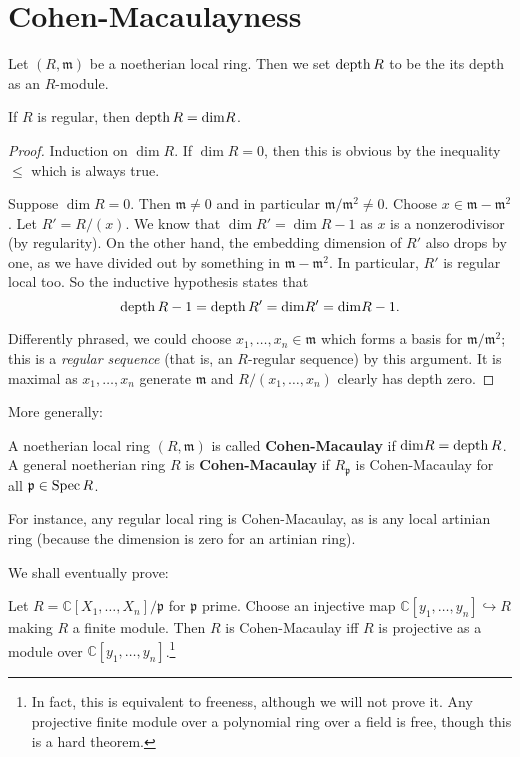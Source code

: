 \section{Cohen-Macaulayness}

\begin{definition}
Let $(R, \mathfrak{m})$ be a noetherian local ring. Then
we set $\operatorname{depth} R$ to be the its depth as an $R$-module.
\end{definition}




\begin{example}
If $R$ is regular, then $\operatorname{depth} R = \mathrm{dim} R$.
\end{example}
\begin{proof}
Induction on $\dim R$. If $\dim R=0$, then this is obvious by
the inequality
$\leq $ which is always true.

Suppose $\dim R = 0$. Then $\mathfrak{m} \neq 0$ and in
particular
$\mathfrak{m}/\mathfrak{m}^2 \neq 0$. Choose $x \in
\mathfrak{m}-
\mathfrak{m}^2$. Let $R'=R/(x)$. We know that $\dim R' = \dim
R-1$ as $x$ is a
nonzerodivisor (by regularity). On the other hand, the embedding
dimension of $R'$ also drops
by one, as we have divided out by something in $\mathfrak{m} -
\mathfrak{m}^2$.
In particular, $R'$ is regular local too. So the inductive
hypothesis states
that
\[\operatorname{depth} R-1 =  \operatorname{depth} R' = \mathrm{dim} R' = \mathrm{dim} R -1.   \]

Differently phrased, we could choose $x_1, \dots, x_n \in
\mathfrak{m}$ which forms a basis for
$\mathfrak{m}/\mathfrak{m}^2$; this is a
\emph{regular sequence} (that is, an $R$-regular sequence) by
this argument. It
is maximal as $x_1, \dots, x_n$ generate $\mathfrak{m}$ and
$R/(x_1, \dots,
x_n)$ clearly has depth zero.
\end{proof}

More generally:
\begin{definition}
A noetherian local ring $(R, \mathfrak{m})$ is called
\textbf{Cohen-Macaulay}
if $\mathrm{dim} R = \operatorname{depth} R$. A general noetherian ring $R$ is
\textbf{Cohen-Macaulay} if
$R_{\mathfrak{p}}$ is Cohen-Macaulay for all $\mathfrak{p} \in
\operatorname{Spec} R$.
\end{definition}
For instance, any regular local ring is Cohen-Macaulay, as is
any local
artinian ring (because the dimension is zero for an artinian
ring).

We shall eventually prove:

\begin{proposition}
Let $R = \mathbb{C}[X_1, \dots, X_n]/\mathfrak{p}$ for
$\mathfrak{p}$ prime.
Choose an injective map $\mathbb{C}[y_1, \dots, y_n]
\hookrightarrow R$ making $R$ a
finite module. Then $R$ is Cohen-Macaulay iff $R$ is projective
as a module
over $\mathbb{C}[y_1, \dots, y_n]$.\footnote{In fact, this is
equivalent to
freeness, although we will not prove it. Any projective finite
module over a
polynomial ring over a field is free, though this is a hard
theorem.}
\end{proposition}

